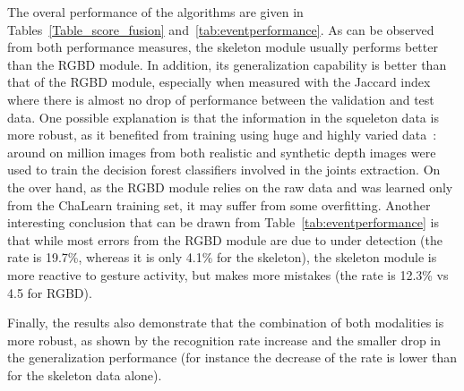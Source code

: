%
The overal performance of the algorithms are given in Tables~\ref{Table_score_fusion} and~\ref{tab:eventperformance}.
%
As can be observed from both performance measures, the skeleton module usually  performs better than the RGBD module.
In addition, its generalization capability  is better than that of the RGBD module, 
especially when measured with the Jaccard index where there is almost no drop of performance between the validation and test data.
%
One possible explanation is that the information in the squeleton data is more robust, as it benefited from training using huge and highly 
varied data~\cite{shotton2011real}: around on million images from both realistic and synthetic depth images were used to train  
the decision forest classifiers involved in the joints extraction.
%
On the over hand, as the  RGBD module relies on  the raw data and was learned only from the ChaLearn training set, it may 
suffer from some overfitting.
%
Another interesting conclusion that can be drawn from Table~\ref{tab:eventperformance} is that while most errors from the RGBD module are due to under detection 
(the \eventmissed rate is 19.7\%, whereas it is only 4.1\% for the skeleton), the skeleton module is more reactive to gesture activity, but makes more mistakes 
(the \eventconfused rate is 12.3\% vs 4.5 for RGBD).


Finally, the results also demonstrate  that the combination of both modalities is more robust,
as shown by the recognition rate increase and the smaller drop in the generalization performance
(for instance the decrease of the \eventaccuracy rate is lower than for the skeleton data alone). 



